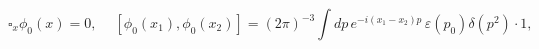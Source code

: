 \begin{equation} \label{freefield}
\square_x \phi_0 (x) = 0, \quad \
[\phi_0 (x_1),\phi_0 (x_2)] = (2 \pi)^{-3} \int \! dp \, e^{-i(x_1-x_2)p}
\, \varepsilon (p_{0}) \delta (p^{2}) \cdot 1,
\end{equation}

